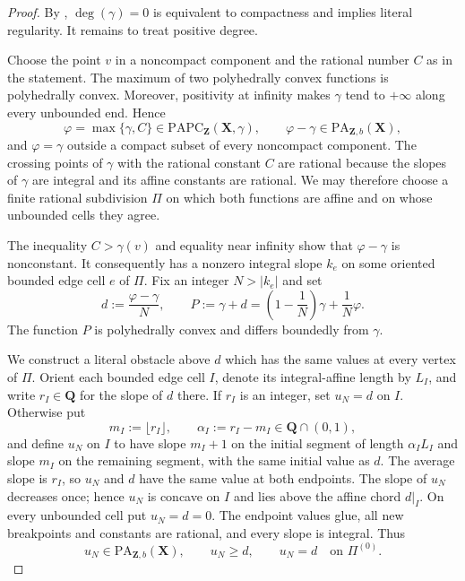 
\begin{proof}
By
,
$\deg(\gamma)=0$ is equivalent to compactness and implies literal
regularity.  It remains to treat positive degree.

Choose the point $v$ in a noncompact component and the rational number $C$
as in the statement.  The maximum of two polyhedrally convex functions is
polyhedrally convex.  Moreover, positivity at infinity makes $\gamma$ tend
to $+\infty$ along every unbounded end.  Hence
\[
 \varphi=\max\{\gamma,C\}\in
 \mathrm{PAPC}_{\mathbf Z}(\mathbf X,\gamma),
 \qquad
 \varphi-\gamma\in\mathrm{PA}_{\mathbf Z,b}(\mathbf X),
\]
and $\varphi=\gamma$ outside a compact subset of every noncompact
component.  The crossing points of $\gamma$ with the rational constant
$C$ are rational because the slopes of $\gamma$ are integral and its
affine constants are rational.  We may therefore choose a finite rational
subdivision $\Pi$ on which both functions are affine and on whose unbounded
cells they agree.

The inequality $C>\gamma(v)$ and equality near infinity show that
$\varphi-\gamma$ is nonconstant.  It consequently has a nonzero integral
slope $k_e$ on some oriented bounded edge cell $e$ of $\Pi$.  Fix an
integer $N>|k_e|$ and set
\[
 d:=\frac{\varphi-\gamma}{N},
 \qquad
 P:=\gamma+d
   =\left(1-\frac1N\right)\gamma+\frac1N\varphi.
\]
The function $P$ is polyhedrally convex and differs boundedly from
$\gamma$.

We construct a literal obstacle above $d$ which has the same values at
every vertex of $\Pi$.  Orient each bounded edge cell $I$, denote its
integral-affine length by $L_I$, and write $r_I\in\mathbf Q$ for the slope
of $d$ there.  If $r_I$ is an integer, set $u_N=d$ on $I$.  Otherwise put
\[
 m_I:=\lfloor r_I\rfloor,
 \qquad
 \alpha_I:=r_I-m_I\in\mathbf Q\cap(0,1),
\]
and define $u_N$ on $I$ to have slope $m_I+1$ on the initial segment of
length $\alpha_IL_I$ and slope $m_I$ on the remaining segment, with the
same initial value as $d$.  The average slope is $r_I$, so $u_N$ and $d$
have the same value at both endpoints.  The slope of $u_N$ decreases once;
hence $u_N$ is concave on $I$ and lies above the affine chord $d|_I$.
On every unbounded cell put $u_N=d=0$.  The endpoint values glue, all new
breakpoints and constants are rational, and every slope is integral.
Thus
\begin{equation}
 u_N\in\mathrm{PA}_{\mathbf Z,b}(\mathbf X),
 \qquad
 u_N\geq d,
 \qquad
 u_N=d\quad\text{on }\Pi^{(0)}.
 \label{eq:frontier-polyhedral-literal-roof}
\end{equation}


\end{proof}
